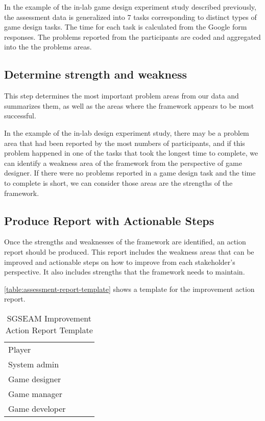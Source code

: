 In the example of the in-lab game design experiment study described previously, the assessment data is generalized into 7 tasks
corresponding to distinct types of game design tasks. The time for each task is calculated from the Google form responses. The 
problems reported from the participants are coded and aggregated into the the problems areas. 

\subsection{Determine strength and weakness}

This step determines the most important problem areas from our
data and summarizes them, as well as the areas where the framework
appears to be most successful.

In the example of the in-lab design experiment study, there may be a problem area that had been reported by the most numbers
of participants, and if this problem happened in one of the tasks that took the longest time to complete, we can identify a weakness 
area of the framework from the perspective of game designer. If there were no problems reported in a game design task and 
the time to complete is short, we can consider those areas are the strengths of the framework.

\subsection{Produce Report with Actionable Steps}

Once the strengths and weaknesses of the framework are identified, an action report should be produced.  This report
includes the weakness areas that can be improved and actionable steps
on how to improve from each stakeholder's perspective. It also
includes strengths that the framework needs to maintain. 

\autoref{table:assessment-report-template} shows a template for the improvement action report.
\begin{table}[ht!]
  \centering
  \begin{tabular}{|p{}|P{0.2\columnwidth}|P{0.2\columnwidth}|P{0.3\columnwidth}|}
    \hline
     &
     &
     & 
     \\
    \hline
    Player & & & \\
    \hline
    System admin & & & \\
    \hline
    Game designer & & & \\
    \hline
    Game manager & & &\\
    \hline
    Game developer & & &\\
    \hline
  \end{tabular}
  \caption{SGSEAM Improvement Action Report Template}
  \label{table:assessment-report-template}
\end{table}


